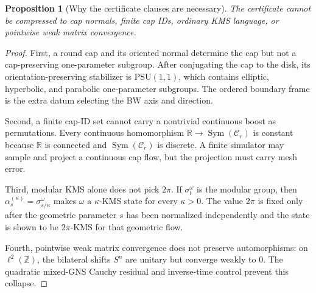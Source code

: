 \documentclass[11pt]{article}
\newtheorem{proposition}[theorem]{Proposition}
\begin{document}
\begin{proposition}[Why the certificate clauses are necessary]\label{prop:bw-certificate-countermodels}
The certificate cannot be compressed to cap normals, finite cap IDs, ordinary KMS language, or
pointwise weak matrix convergence.
\end{proposition}

\begin{proof}
First, a round cap and its oriented normal determine the cap but not a cap-preserving
one-parameter subgroup. After conjugating the cap to the disk, its orientation-preserving
stabilizer is \(\mathrm{PSU}(1,1)\), which contains elliptic, hyperbolic, and parabolic
one-parameter subgroups. The ordered boundary frame is the extra datum selecting the BW axis and
direction.

Second, a finite cap-ID set cannot carry a nontrivial continuous boost as permutations. Every
continuous homomorphism \(\mathbb R\to\operatorname{Sym}(\mathcal C_r)\) is constant because
\(\mathbb R\) is connected and \(\operatorname{Sym}(\mathcal C_r)\) is discrete. A finite
simulator may sample and project a continuous cap flow, but the projection must carry mesh error.

Third, modular KMS alone does not pick \(2\pi\). If \(\sigma_t^\omega\) is the modular group, then
\(\alpha_s^{(\kappa)}=\sigma_{s/\kappa}^\omega\) makes \(\omega\) a \(\kappa\)-KMS state for
every \(\kappa>0\). The value \(2\pi\) is fixed only after the geometric parameter \(s\) has been
normalized independently and the state is shown to be \(2\pi\)-KMS for that geometric flow.

Fourth, pointwise weak matrix convergence does not preserve automorphisms: on \(\ell^2(\mathbb Z)\),
the bilateral shifts \(S^n\) are unitary but converge weakly to \(0\). The quadratic mixed-GNS
Cauchy residual and inverse-time control prevent this collapse.
\end{proof}
\end{document}
